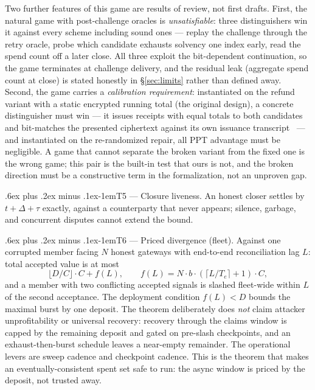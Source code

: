 \documentclass[9pt]{extarticle}
\makeatletter
\renewcommand\paragraph{\@startsection{paragraph}{4}{0pt}%
  {.6ex plus .2ex minus .1ex}{-1em}{\normalfont\normalsize\bfseries}}
\makeatother
\begin{document}
Two further features of this game are results of review, not first drafts.
First, the natural game with post-challenge oracles is
\emph{unsatisfiable}:
three distinguishers win it against every scheme including sound ones ---
replay the challenge through the retry oracle, probe which candidate
exhausts solvency one index early, read the spend count off a later
close. All three exploit the bit-dependent continuation, so the game
terminates at challenge delivery, and the residual leak (aggregate spend
count at close) is stated honestly in \S\ref{sec:limits} rather than
defined away. Second, the game carries a \emph{calibration requirement}:
instantiated on the refund variant with a static encrypted running total
(the original design), a concrete distinguisher must win --- it issues
receipts with equal totals to both candidates and bit-matches the
presented ciphertext against its own issuance
transcript~\cite{omarespejel2026} --- and instantiated on the
re-randomized repair, all PPT advantage must be negligible. A game that
cannot separate the broken variant from the fixed one is the wrong game;
this pair is the built-in test that ours is not, and the broken direction
must be a constructive term in the formalization, not an unproven gap.

\paragraph{T5 --- Closure liveness.} An honest closer settles by
$t + \Delta + \tau$ exactly, against a counterparty that never appears;
silence, garbage, and concurrent disputes cannot extend the bound.

\paragraph{T6 --- Priced divergence (fleet).} Against one corrupted member
facing $N$ honest gateways with end-to-end reconciliation lag $L$: total
accepted value is at most
\[
\lfloor D/C \rfloor \cdot C + f(L), \qquad
f(L) = N \cdot b \cdot (\lceil L/T_e \rceil + 1) \cdot C,
\]
and a member with two conflicting accepted signals is slashed fleet-wide
within $L$ of the second acceptance. The deployment condition $f(L) < D$
bounds the maximal burst by one deposit. The theorem deliberately does
\emph{not} claim attacker unprofitability or universal recovery: recovery
through the claims window is capped by the remaining deposit and gated on
pre-slash checkpoints, and an exhaust-then-burst schedule leaves a
near-empty remainder. The operational levers are sweep cadence and
checkpoint cadence. This is the theorem that makes an
eventually-consistent spent set safe to run: the async window is priced by
the deposit, not trusted away.
\end{document}
